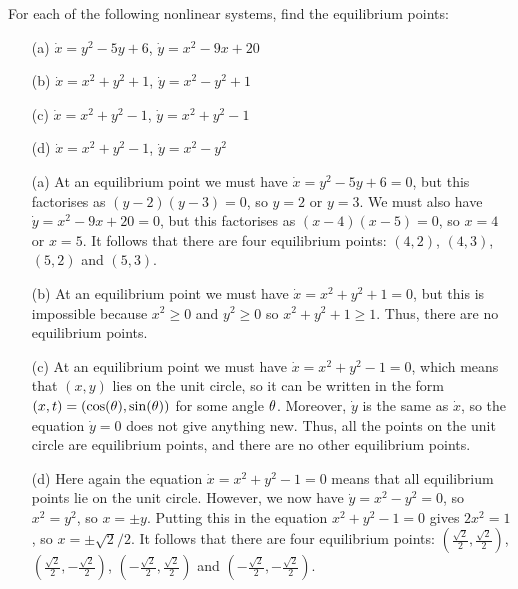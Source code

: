 \documentclass[a4paper]{amsart}
\begin{document}
\begin{exercise}\label{ex-equilibria-a}
 For each of the following nonlinear systems, find the equilibrium
 points:
 \begin{itemize}
  \item[(a)] $\dot{x}=y^2-5y+6$,\; $\dot{y}=x^2-9x+20$
  \item[(b)] $\dot{x}=x^2+y^2+1$,\; $\dot{y}=x^2-y^2+1$
  \item[(c)] $\dot{x}=x^2+y^2-1$,\; $\dot{y}=x^2+y^2-1$
  \item[(d)] $\dot{x}=x^2+y^2-1$,\; $\dot{y}=x^2-y^2$
 \end{itemize}
\end{exercise}
\begin{solution}\leavevmode
 \begin{itemize}
  \item[(a)] At an equilibrium point we must have $\dot{x}=y^2-5y+6=0$, but
   this factorises as $(y-2)(y-3)=0$, so $y=2$ or $y=3$.  We must also
   have $\dot{y}=x^2-9x+20=0$, but this factorises as $(x-4)(x-5)=0$,
   so $x=4$ or $x=5$.  It follows that there are four equilibrium
   points: $(4,2)$, $(4,3)$, $(5,2)$ and $(5,3)$.
  \item[(b)] At an equilibrium point we must have
   $\dot{x}=x^2+y^2+1=0$, but this is impossible because $x^2\geq 0$
   and $y^2\geq 0$ so $x^2+y^2+1\geq 1$.  Thus, there are no
   equilibrium points.
  \item[(c)] At an equilibrium point we must have
   $\dot{x}=x^2+y^2-1=0$, which means that $(x,y)$ lies on the unit
   circle, so it can be written in the form
   $(x,t)=(\cos(\theta),\sin(\theta))$ for some angle $\theta$.  Moreover,
   $\dot{y}$ is the same as $\dot{x}$, so the equation $\dot{y}=0$
   does not give anything new.  Thus, all the points on the unit
   circle are equilibrium points, and there are no other equilibrium
   points.
  \item[(d)] Here again the equation $\dot{x}=x^2+y^2-1=0$ means that
   all equilibrium points lie on the unit circle.  However, we now
   have $\dot{y}=x^2-y^2=0$, so $x^2=y^2$, so $x=\pm y$.  Putting this
   in the equation $x^2+y^2-1=0$ gives $2x^2=1$, so
   $x=\pm \sqrt{2}/2$.  It follows that there are four equilibrium
   points:
   $( \frac{\sqrt{2}}{2}, \frac{\sqrt{2}}{2})$,
   $( \frac{\sqrt{2}}{2},-\frac{\sqrt{2}}{2})$,
   $(-\frac{\sqrt{2}}{2}, \frac{\sqrt{2}}{2})$ and
   $(-\frac{\sqrt{2}}{2},-\frac{\sqrt{2}}{2})$.
 \end{itemize}
\end{solution}
\end{document}
